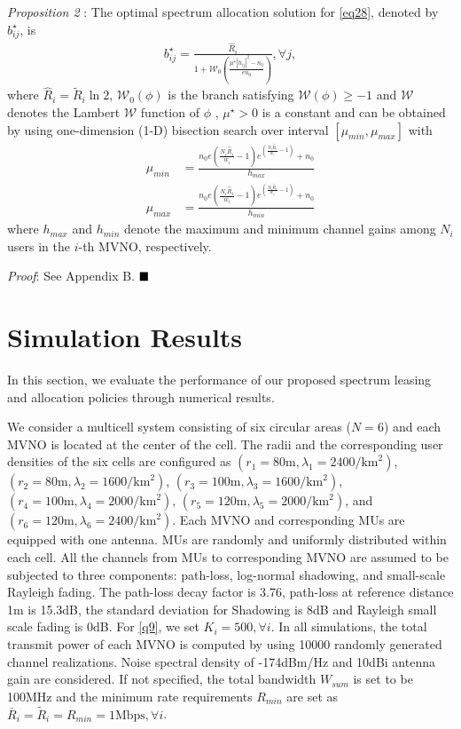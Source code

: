 \documentclass[journal]{IEEEtran}
\begin{document}
\textit{Proposition 2} : The optimal spectrum allocation solution for \eqref{eq28}, denoted by $b_{ij}^\star$, is
\begin{align}
b_{ij}^\star = \frac{\hat{R}_i}{1 + \mathcal{W}_0\left(\frac{\mu^{\star}\left|h_{ij}\right|^2 - n_0}{en_0}\right)}, \forall j,
\end{align}
where $\hat{R}_i = \tilde{R}_i\ln2$, $\mathcal{W}_0\left(\phi\right)$ is the branch satisfying $\mathcal{W}\left(\phi\right) \geq -1$ and $\mathcal{W}$ denotes the Lambert $\mathcal{W}$ function of $\phi$ \cite{RMCorless}, $\mu^{\star} > 0$ is a constant and can be obtained by using one-dimension (1-D) bisection search over interval $\left[\mu_{min}, \mu_{max}\right]$ with
\begin{align}
\mu_{min} &= \frac{n_0e\left(\frac{N_i\hat{R}_i}{w_i} - 1\right)e^{\left(\frac{N_i\hat{R}_i}{w_i} - 1\right)} + n_0}{h_{max}}  \\
\mu_{max} & = \frac{n_0e\left(\frac{N_i\hat{R}_i}{w_i} - 1\right)e^{\left(\frac{N_i\hat{R}_i}{w_i} - 1\right)} + n_0}{h_{min}}
\end{align}
where $h_{max}$ and $h_{min}$ denote the maximum and minimum channel gains among $N_i$ users in the $i$-th MVNO, respectively.

\textit{Proof}: See Appendix B.  $\hfill\blacksquare$
\section{Simulation Results}
In this section, we evaluate the performance of our proposed spectrum leasing and allocation policies through numerical results. 

We consider a multicell system consisting of six circular areas ($N = 6$) and each MVNO is located at the center of the cell. The radii and the corresponding user densities of the six cells are configured as $(r_1 = 80\mbox{m}, \lambda_1 = 2400/\mbox{km}^2)$, $(r_2 = 80\mbox{m}, \lambda_2 = 1600/\mbox{km}^2)$, $(r_3 = 100\mbox{m}, \lambda_3 = 1600/\mbox{km}^2)$, $(r_4 = 100\mbox{m}, \lambda_4 = 2000/\mbox{km}^2)$, $(r_5 = 120\mbox{m}, \lambda_5 = 2000/\mbox{km}^2)$, and $(r_6 = 120\mbox{m}, \lambda_6 = 2400/\mbox{km}^2)$. Each MVNO and corresponding MUs are equipped with one antenna. MUs are randomly and uniformly distributed within each cell. All the channels from MUs to corresponding MVNO are assumed to be subjected to three components: path-loss, log-normal shadowing, and small-scale Rayleigh fading. The path-loss decay factor is 3.76, 
path-loss at reference distance 1m is 15.3dB, the standard deviation for Shadowing is 8dB and Rayleigh small scale fading is 0dB. For \eqref{q9}, we set $K_i = 500, \forall i$. In all simulations, the total transmit power of each MVNO is computed by using 10000 randomly generated channel realizations. Noise spectral density of -174dBm/Hz and 10dBi antenna gain are considered. If not specified, the total bandwidth $W_{sum}$ is set to be 100MHz and the minimum rate requirements $R_{min}$ are set as $\bar{R}_i = \tilde{R}_i = R_{min} = 1\mbox{Mbps}, \forall i$.
\end{document}
